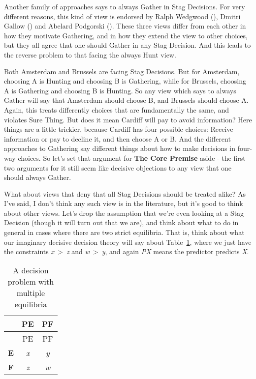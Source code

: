 \documentclass[
  11pt,
  letterpaper,
  DIV=11,
  numbers=noendperiod,
  twoside]{scrartcl}
\begin{document}
Another family of approaches says to always Gather in Stag Decisions.
For very different reasons, this kind of view is endorsed by Ralph
Wedgwood (), Dmitri Gallow
() and Abelard Podgorski
(). These three views differ from each
other in how they motivate Gathering, and in how they extend the view to
other choices, but they all agree that one should Gather in any Stag
Decision. And this leads to the reverse problem to that facing the
always Hunt view.

Both Amsterdam and Brussels are facing Stag Decisions. But for
Amsterdam, choosing A is Hunting and choosing B is Gathering, while for
Brussels, choosing A is Gathering and choosing B is Hunting. So any view
which says to always Gather will say that Amsterdam should choose B, and
Brussels should choose A. Again, this treats differently choices that
are fundamentally the same, and violates Sure Thing. But does it mean
Cardiff will pay to avoid information? Here things are a little
trickier, because Cardiff has four possible choices: Receive information
or pay to decline it, and then choose A or B. And the different
approaches to Gathering say different things about how to make decisions
in four-way choices. So let's set that argument for \textbf{The Core
Premise} aside - the first two arguments for it still seem like decisive
objections to any view that one should always Gather.

What about views that deny that all Stag Decisions should be treated
alike? As I've said, I don't think any such view is in the literature,
but it's good to think about other views. Let's drop the assumption that
we're even looking at a Stag Decision (though it will turn out that we
are), and think about what to do in general in cases where there are two
strict equilibria. That is, think about what our imaginary decisive
decision theory will say about Table~\ref{tbl-two-eqm}, where we just
have the constraints \emph{x}~\textgreater~\emph{z} and
\emph{w}~\textgreater~\emph{y}, and again \emph{PX} means the predictor
predicts \emph{X}.

\begin{longtable}[]{@{}lcc@{}}
\caption{A decision problem with multiple
equilibria}\label{tbl-two-eqm}\tabularnewline
\toprule\noalign{}
& PE & PF \\
\midrule\noalign{}
\endfirsthead
\toprule\noalign{}
& PE & PF \\
\midrule\noalign{}
\endhead
\bottomrule\noalign{}
\endlastfoot
\textbf{E} & \emph{x} & \emph{y} \\
\textbf{F} & \emph{z} & \emph{w} \\
\end{longtable}
\end{document}
